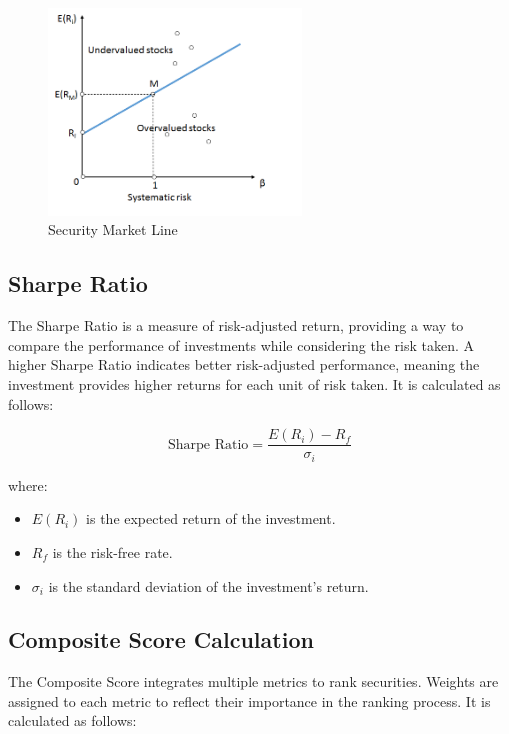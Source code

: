 \begin{figure}[!ht]
    \centering
    \includegraphics[width=0.6\textwidth]{../Figures/SML.png}
    \caption{Security Market Line \citep{wikipediaSML}}
    \label{fig:SML}

\end{figure}


\newpage


\subsection{Sharpe Ratio}
The Sharpe Ratio is a measure of risk-adjusted return, providing a way to compare the performance of investments while considering the risk taken. A higher Sharpe Ratio indicates better risk-adjusted performance, meaning the investment provides higher returns for each unit of risk taken. It is calculated as follows:

\begin{equation}
\text{Sharpe Ratio} = \frac{E(R_i) - R_f}{\sigma_i}
\end{equation}

where:
\begin{itemize}
    \item $E(R_i)$ is the expected return of the investment.
    \item $R_f$ is the risk-free rate.
    \item $\sigma_i$ is the standard deviation of the investment's return.
\end{itemize}

\subsection{Composite Score Calculation}
The Composite Score integrates multiple metrics to rank securities. Weights are assigned to each metric to reflect their importance in the ranking process. It is calculated as follows:

